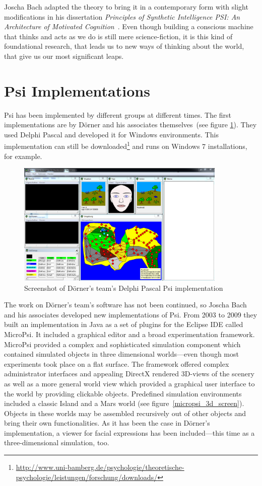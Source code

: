 Joscha Bach adapted the theory to bring it in a contemporary form with slight modifications in his dissertation \emph{Principles of Synthetic Intelligence PSI: An Architecture of Motivated Cognition}~\cite{Bach:2009:PSI:1611304}. Even though building a conscious machine that thinks and acts as we do is still mere science-fiction, it is this kind of foundational research, that leads us to new ways of thinking about the world, that give us our most significant leaps.
    
    \section{Psi Implementations}
Psi has been implemented by different groups at different times. The first implementations are by Dörner and his associates themselves~(see figure \ref{psi_screen}). They used Delphi Pascal and developed it for Windows environments. This implementation can still be downloaded\footnote{\url{http://www.uni-bamberg.de/psychologie/theoretische-psychologie/leistungen/forschung/downloads/}} and runs on Windows 7 installations, for example. 

\begin{figure}[h]
  \centering
    \includegraphics[width=10cm]{graphics/psi_screen1}
  \caption[Screenshot of Dörner's Psi implementation]{Screenshot of Dörner's team's Delphi Pascal Psi implementation}
  \label{psi_screen}
\end{figure}

The work on Dörner's team's software has not been continued, so Joscha Bach and his associates developed new implementations of Psi. From 2003 to 2009 they built an implementation in Java as a set of plugins for the Eclipse IDE called MicroPsi. It included a graphical editor and a broad experimentation framework. MicroPsi provided a complex and sophisticated simulation component which contained simulated objects in three dimensional worlds---even though most experiments took place on a flat surface. The framework offered complex administrator interfaces and appealing DirectX rendered 3D-views of the scenery as well as a more general world view which provided a graphical user interface to the world by providing clickable objects. Predefined simulation environments included a classic Island and a Mars world (see figure~\ref{micropsi_3d_screen}). Objects in these worlds may be assembled recursively out of other objects and bring their own functionalities. As it has been the case in Dörner's implementation, a viewer for facial expressions has been included---this time as a three-dimensional simulation, too.~\cite{Bach:2009:PSI:1611304}


